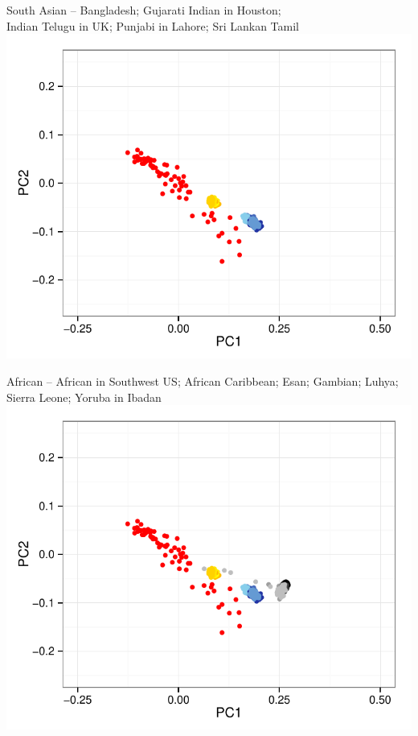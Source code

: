 \documentclass[11pt,xcolor=table]{beamer}
\begin{document}
\begin{frame}{\scriptsize{South Asian -- Bangladesh; Gujarati Indian in Houston;\\ Indian Telugu in UK; Punjabi in Lahore; Sri Lankan Tamil}}
\centering
\includegraphics[width=1\textwidth]{pics/pel-EAS-SAS.pdf}
\end{frame}

\begin{frame}{\scriptsize{African -- African in Southwest US; African Caribbean; Esan; Gambian; Luhya; \\Sierra Leone; Yoruba in Ibadan}}
\centering
\includegraphics[width=1\textwidth]{pics/pel-EAS-SAS-AFR.pdf}
\end{frame}
\end{document}
